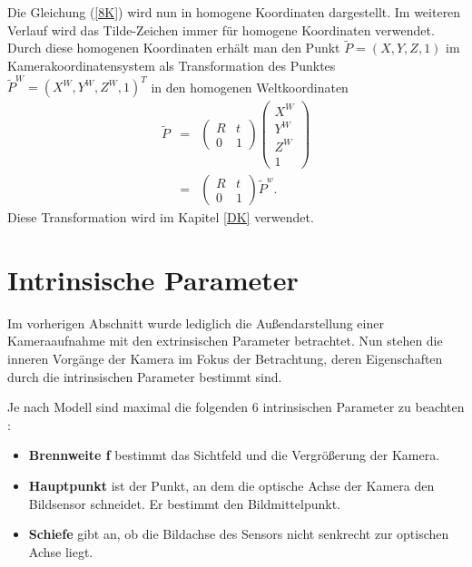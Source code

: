 {Die Gleichung (\ref{8K}) wird nun in homogene Koordinaten dargestellt. 
Im weiteren Verlauf wird das Tilde-Zeichen immer für homogene Koordinaten verwendet.
Durch diese homogenen Koordinaten erhält man den Punkt $\tilde P=(X,Y,Z,1)$ im Kamerakoordinatensystem
als Transformation des Punktes $\tilde P^W=(X^W, Y^W, Z^W, 1)^T$  
in den homogenen Weltkoordinaten
\begin{eqnarray} \label{7K}
    \tilde P
    &=& 
    \left (
    \begin{array}{cc}
        R & t\\
        0 & 1
    \end{array}
    \right )
    \left (
    \begin{array}{c}
        X^W \\ Y^W \\ Z^W \\ 1
    \end{array}
    \right )\nonumber\\
    & = &
    \left (
    \begin{array}{cc}
        R & t\\
        0 & 1
    \end{array}
    \right )
    \tilde P^w
    .
\end{eqnarray}
Diese Transformation wird im Kapitel \ref{DK} verwendet.

\section{Intrinsische Parameter} \label{IP}
Im vorherigen Abschnitt wurde lediglich die Außendarstellung einer \linebreak 
Kameraaufnahme mit den extrinsischen Parameter betrachtet.
Nun stehen die inneren Vorgänge der Kamera im Fokus der Betrachtung, 
deren Eigenschaften durch die intrinsischen Parameter bestimmt sind.

Je nach Modell sind maximal die folgenden 6 intrinsischen Parameter zu beachten \cite{Kruse:2023}:

\begin{itemize}
    \item \textbf{Brennweite f}	
    bestimmt das Sichtfeld und die Vergrößerung der Kamera.
    
    \item \textbf{Hauptpunkt} 	
    ist der Punkt, an dem die optische Achse der Kamera den Bildsensor schneidet. Er bestimmt den Bildmittelpunkt.
    
    \item \textbf{Schiefe} 
    gibt an, ob die Bildachse des Sensors nicht senkrecht zur optischen Achse liegt.
    

\end{itemize}}
